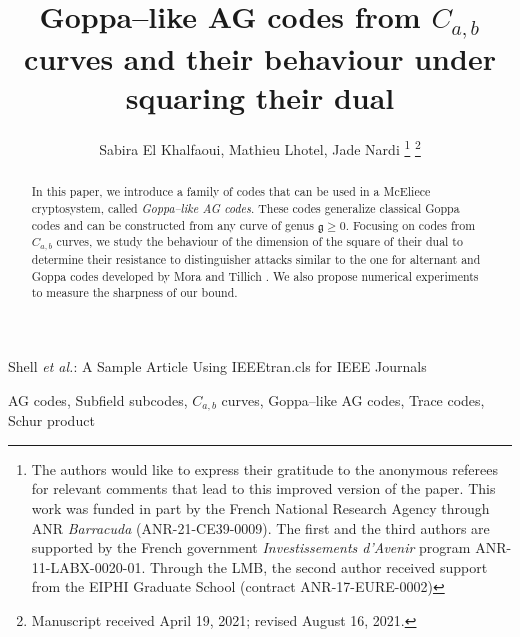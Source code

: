 \documentclass[lettersize,journal]{IEEEtran}
\theoremstyle{plain}
\theoremstyle{definition}
\theoremstyle{remark}
\begin{document}
	
	\title{Goppa--like AG codes from $C_{a,b}$ curves and their behaviour under squaring their dual}
	

	\author{Sabira El Khalfaoui, Mathieu Lhotel, Jade Nardi
		\thanks{The authors would like to express their gratitude to the anonymous referees for relevant comments that lead to this improved version of the paper.
			This work was funded in part by the French National Research Agency through ANR \textit{Barracuda} (ANR-21-CE39-0009). The first and the third authors are supported by the French government \textit{Investissements d’Avenir} program ANR-11-LABX-0020-01. Through the LMB, the second author received support from the  EIPHI Graduate School (contract ANR-17-EURE-0002)}%
		\thanks{Manuscript received April 19, 2021; revised August 16, 2021.}}
	
	{Shell \MakeLowercase{\textit{et al.}}: A Sample Article Using IEEEtran.cls for IEEE Journals}
	
	
	
	
	\maketitle
	
	\begin{abstract}
		In this paper, we introduce a family of codes that can be used in a McEliece cryptosystem, called \emph{Goppa--like AG codes}. These codes generalize classical Goppa codes and can be constructed from any curve of genus $\mathfrak{g} \geq 0$. Focusing on codes from $C_{a,b}$ curves, we study the behaviour of the dimension of the square of their dual to determine their resistance to distinguisher attacks similar to the one for alternant and Goppa codes developed by Mora and Tillich \cite{MT21}. We also propose numerical experiments to measure the sharpness of our bound.
	\end{abstract}
	
	\begin{IEEEkeywords}
		AG codes, Subfield subcodes, $C_{a,b}$ curves, Goppa--like AG codes, Trace codes, Schur product
	\end{IEEEkeywords}
	
\end{document}
